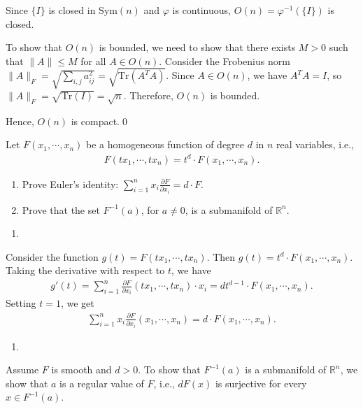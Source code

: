 Since $\{I\}$ is closed in $\mathrm{Sym}(n)$ and $\varphi$ is continuous, $O(n)=\varphi^{-1}(\{I\})$ is closed.

To show that $O(n)$ is bounded, we need to show that there exists $M>0$ such that $\|A\|\le M$ for all $A\in O(n)$. Consider the Frobenius norm $\|A\|_F=\sqrt{\sum_{i,j}a_{ij}^2}=\sqrt{\mathrm{Tr}(A^TA)}$. Since $A\in O(n)$, we have $A^TA=I$, so $\|A\|_F=\sqrt{\mathrm{Tr}(I)}=\sqrt{n}$. Therefore, $O(n)$ is bounded.

Hence, $O(n)$ is compact.\qed

\clearpage
{}
Let $F(x_1,\cdots,x_n)$ be a homogeneous function of degree $d$ in $n$ real variables, i.e.,
\begin{align}
    F(tx_1,\cdots,tx_n)=t^d\cdot F(x_1,\cdots,x_n).
\end{align}
\begin{enumerate}
    \item Prove Euler's identity: $\displaystyle\sum_{i=1}^{n}x_i\frac{\partial F}{\partial x_i}=d\cdot F$.
    \item Prove that the set $F^{-1}(a)$, for $a\neq 0$, is a submanifold of $\mathbb{R}^n$.
\end{enumerate}
\answer{}



\begin{enumerate}
    \item [1.]
\end{enumerate}
Consider the function $g(t)=F(tx_1,\cdots,tx_n)$. Then $g(t)=t^d\cdot F(x_1,\cdots,x_n)$. Taking the derivative with respect to $t$, we have
\begin{align}
    g'(t)=\sum_{i=1}^{n}\frac{\partial F}{\partial x_i}(tx_1,\cdots,tx_n)\cdot x_i=dt^{d-1}\cdot F(x_1,\cdots,x_n).
\end{align}
Setting $t=1$, we get
\begin{align}
    \sum_{i=1}^{n}x_i\frac{\partial F}{\partial x_i}(x_1,\cdots,x_n)=d\cdot F(x_1,\cdots,x_n).
\end{align} 

\begin{enumerate}
    \item [2.]
\end{enumerate}
Assume $F$ is smooth and $d>0$. To show that $F^{-1}(a)$ is a submanifold of $\mathbb{R}^n$, we show that $a$ is a regular value of $F$, i.e., $dF(x)$ is surjective for every $x\in F^{-1}(a)$.

